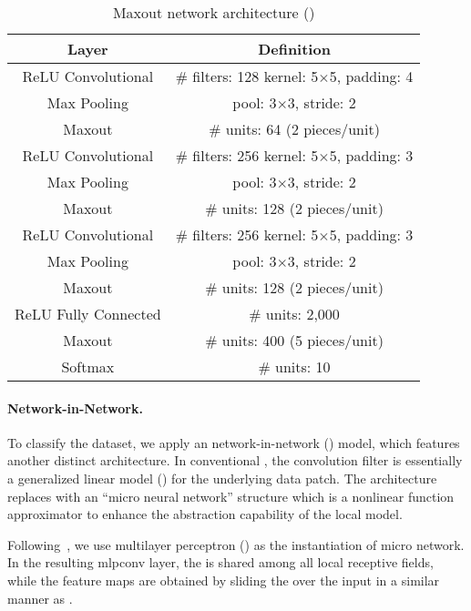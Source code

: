 \begin{table}[h]{\small
  \centering
\begin{tabular}{c|c}
{\bf Layer} & {\bf Definition} \\
\hline
ReLU Convolutional & \# filters: 128 kernel: 5$\times$5, padding: 4 \\
\hline
Max Pooling & pool: 3$\times$3, stride: 2 \\
\hline
Maxout & \# units: 64 (2 pieces/unit)\\
\hline
ReLU Convolutional & \# filters: 256 kernel: 5$\times$5, padding: 3 \\
\hline
Max Pooling & pool: 3$\times$3, stride: 2\\
\hline
Maxout & \# units: 128 (2 pieces/unit)\\
\hline
ReLU Convolutional &  \# filters: 256 kernel: 5$\times$5, padding: 3 \\
\hline
Max Pooling & pool: 3$\times$3, stride: 2\\
\hline
Maxout & \# units: 128 (2 pieces/unit)\\
\hline
ReLU Fully Connected & \# units: 2,000 \\
\hline
Maxout & \# units: 400 (5 pieces/unit)\\
\hline
Softmax & \# units: 10\\
\hline

\end{tabular}
\caption{Maxout network architecture (\cifar) \label{tab:cifar10} }}
\end{table}

\paragraph*{Network-in-Network.\;}

To classify the \svhn dataset, we apply an network-in-network (\nin) model, which features another distinct architecture. In conventional \cnn, the convolution filter is essentially a generalized linear model (\glm) for the underlying data patch. The \nin architecture replaces  \glm with an ``micro neural network'' structure which is a nonlinear function approximator to enhance the abstraction capability of the local model.

Following~\cite{lin:2014:iclr}, we use multilayer perceptron (\mlp) as the instantiation of micro network. In the resulting mlpconv layer, the \mlp is shared among all local receptive fields, while the feature maps are obtained by sliding the \mlp over the input in a similar manner as \cnn.

